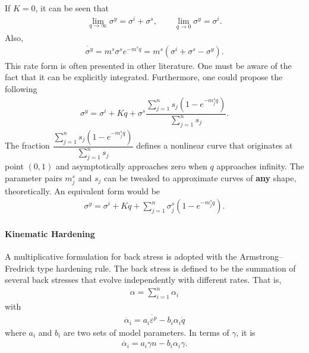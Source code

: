 If $K=0$, it can be seen that
\begin{gather}
\lim\limits_{q\rightarrow\infty}\sigma^y=\sigma^i+\sigma^s,\qquad
\lim\limits_{q\rightarrow0}\sigma^y=\sigma^i.
\end{gather}
Also,
\begin{gather}
\dot{\sigma^y}=m^s\sigma^se^{-m^sq}=m^s\left(\sigma^i+\sigma^s-\sigma^y\right).
\end{gather}
This rate form is often presented in other literature. One must be aware of the fact that it can be explicitly integrated.
Furthermore, one could propose the following
\begin{gather}
\sigma^y=\sigma^i+Kq+\sigma^s\dfrac{\sum_{j=1}^{n}s_j\left(1-e^{-m^s_jq}\right)}{\sum_{j=1}^{n}s_j}.
\end{gather}
The fraction $\dfrac{\sum_{j=1}^{n}s_j\left(1-e^{-m^s_jq}\right)}{\sum_{j=1}^{n}s_j}$ defines a nonlinear curve that originates at point $\left(0,1\right)$ and asymptotically approaches zero when $q$ approaches infinity.
The parameter pairs $m^s_j$ and $s_j$ can be tweaked to approximate curves of \textbf{any} shape, theoretically.
An equivalent form would be
\begin{gather}
\sigma^y=\sigma^i+Kq+\sum_{j=1}^{n}\sigma^s_j\left(1-e^{-m^s_jq}\right).
\end{gather}
\paragraph{Kinematic Hardening}
A multiplicative formulation \cite{Chaboche1989} for back stress is adopted with the Armstrong--Fredrick type hardening rule. The back stress is defined to be the summation of several back stresses that evolve independently with different rates. That is,
\begin{gather}
\alpha=\sum_{i=1}^n\alpha_i
\end{gather}
with
\begin{gather}\label{eq:af_kinematic}
\dot{\alpha_i}=a_i\dot{\varepsilon^p}-b_i\alpha_i\dot{q}
\end{gather}
where $a_i$ and $b_i$ are two sets of model parameters. In terms of $\gamma$, it is
\begin{gather}
\dot{\alpha_i}=a_i\gamma{}n-b_i\alpha_i\gamma.
\end{gather}
